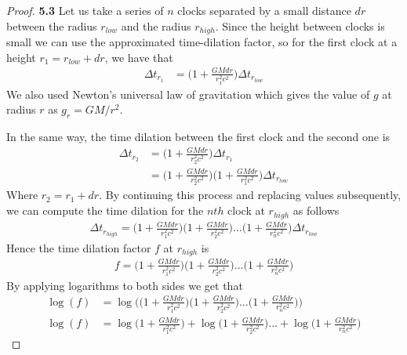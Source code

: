 \documentclass[11pt]{article}
\theoremstyle{definition}
\begin{document}
\cleardoublepage
\begin{proof}{\textbf{5.3}}
    Let us take a series of $n$ clocks separated by a small distance $dr$
    between the radius $r_{low}$ and the radius $r_{high}$.
    Since the height between clocks is small we can use the approximated
    time-dilation factor, so for the first clock at a height
    $r_1 = r_{low} + dr$, we have that
    \begin{align*}
        \Delta t_{r_1} &=
        \bigg(1 + \frac{GMdr}{r_1^2c^2}\bigg)\Delta t_{r_{low}}
    \end{align*}
    We also used Newton's universal law of gravitation which gives the value of
    $g$ at radius $r$ as $g_r = GM/r^2$.

    In the same way, the time dilation between the first clock and
    the second one is
    \begin{align*}
        \Delta t_{r_2} &= \bigg(1 + \frac{GMdr}{r_2^2c^2}\bigg) \Delta t_{r_1}\\
        &= \bigg(1 + \frac{GMdr}{r_2^2c^2}\bigg)
            \bigg(1 + \frac{GMdr}{r_1^2c^2}\bigg) \Delta t_{r_{low}}
    \end{align*}
    Where $r_2 = r_1 + dr$.
    By continuing this process and replacing values subsequently, we can
    compute the time dilation for the $nth$ clock at $r_{high}$ as follows
    \begin{align*}
        \Delta t_{r_{high}} =
        \bigg(1 + \frac{GMdr}{r_1^2c^2}\bigg)
        \bigg(1 + \frac{GMdr}{r_2^2c^2}\bigg)
        ... \bigg(1 + \frac{GMdr}{r_n^2c^2}\bigg) \Delta t_{r_{low}}
    \end{align*}
    Hence the time dilation factor $f$ at $r_{high}$ is 
    \begin{align*}
        f =
        \bigg(1 + \frac{GMdr}{r_1^2c^2}\bigg)
        \bigg(1 + \frac{GMdr}{r_2^2c^2}\bigg)
        ... \bigg(1 + \frac{GMdr}{r_n^2c^2}\bigg)
    \end{align*}
    By applying logarithms to both sides we get that
    \begin{align*}
        \log(f)
            &= \log \bigg(
                \bigg(1 + \frac{GMdr}{r_1^2c^2}\bigg)
                \bigg(1 + \frac{GMdr}{r_2^2c^2}\bigg)
                ... \bigg(1 + \frac{GMdr}{r_n^2c^2}\bigg)
            \bigg)\\
        \log(f) &= 
            \log\bigg(1 + \frac{GMdr}{r_1^2c^2}\bigg) 
            + \log\bigg(1 + \frac{GMdr}{r_2^2c^2}\bigg)
            ... 
            + \log\bigg(1 + \frac{GMdr}{r_n^2c^2}\bigg)

\end{align*}
\end{proof}
\end{document}
